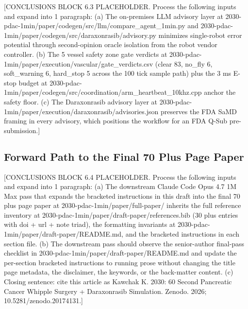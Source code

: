 [CONCLUSIONS BLOCK 6.3 PLACEHOLDER. Process the following inputs and expand into 1 paragraph:
(a) The on-premises LLM advisory layer at 2030-pdac-1min/paper/codegen/src/llm/compare_agent_1min.py and 2030-pdac-1min/paper/codegen/src/daraxonrasib/advisory.py minimizes single-robot error potential through second-opinion oracle isolation from the robot vendor controller.
(b) The 5 vessel safety zone gate verdicts at 2030-pdac-1min/paper/execution/vascular/gate_verdicts.csv (clear 83, no_fly 6, soft_warning 6, hard_stop 5 across the 100 tick sample path) plus the 3 ms E-stop budget at 2030-pdac-1min/paper/codegen/src/coordination/arm_heartbeat_10khz.cpp anchor the safety floor.
(c) The Daraxonrasib advisory layer at 2030-pdac-1min/paper/execution/daraxonrasib/advisories.json preserves the FDA SaMD framing \cite{fda-samd} in every advisory, which positions the workflow for an FDA Q-Sub pre-submission.]

\subsection{Forward Path to the Final 70 Plus Page Paper}
\label{sec:conclusions-forward}

[CONCLUSIONS BLOCK 6.4 PLACEHOLDER. Process the following inputs and expand into 1 paragraph:
(a) The downstream Claude Code Opus 4.7 1M Max pass that expands the bracketed instructions in this draft into the final 70 plus page paper at 2030-pdac-1min/paper/full-paper/ inherits the full reference inventory at 2030-pdac-1min/paper/draft-paper/references.bib (30 plus entries with doi + url + note triad), the formatting invariants at 2030-pdac-1min/paper/draft-paper/README.md, and the bracketed instructions in each section file.
(b) The downstream pass should observe the senior-author final-pass checklist in 2030-pdac-1min/paper/draft-paper/README.md and update the per-section bracketed instructions to running prose without changing the title page metadata, the disclaimer, the keywords, or the back-matter content.
(c) Closing sentence: cite this article as Kawchak K. 2030: 60 Second Pancreatic Cancer Whipple Surgery + Daraxonrasib Simulation. Zenodo. 2026; 10.5281/zenodo.20174131.]
